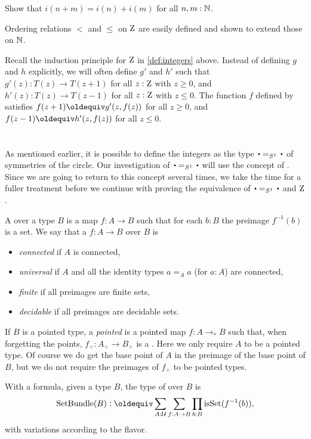 \begin{xca}\label{xca:addition-on-Z-and-N}
Show that $i(n+m)=i(n)+i(m)$ for all $n,m:\mathbb{N}$.
\end{xca}

Ordering relations $<$ and $\leq$ on $\mathrm{Z}$ are easily defined
and shown to extend those on $\mathbb{N}$.

Recall the induction principle for $\mathrm{Z}$ in \cref{def:integers} above.
Instead of defining $g$ and $h$ explicitly, we will often
define $g'$ and $h'$ such that $g'(z): T(z)\to T(z+1)$ 
for all $z:\mathrm{Z}$ with $z\geq 0$, and $h'(z): T(z)\to T(z-1)$ 
for all $z:\mathrm{Z}$ with $z\leq 0$. The function $f$ defined by 
satisfies $f(z+1)\jdeq g'(z,f(z))$ for all $z\geq 0$,
and $f(z-1)\jdeq h'(z,f(z))$ for all $z\leq 0$.


\section{\Coverings}
\label{sec:covering}

As mentioned earlier, it is possible to define the integers as the
type $\base=_{S^1}\base$ of symmetries of the circle.
Our investigation of $\base=_{S^1}\base$ will use the concept of \coverings. 
Since we are going to return to this concept several times, 
we take the time for a fuller treatment before we continue with
proving the equivalence of $\base=_{S^1}\base$ and $\mathrm{Z}$.

\begin{definition}\label{def:covering}
A \emph{\covering} over a type $B$ 
is a map $f:A\to B$ such that for each $b:B$ the preimage $f^{-1}(b)$ is a set.
We say that a \covering $f:A\to B$ over $B$ is
\begin{itemize}
\item \emph{connected} if $A$ is connected, 
\item \emph{universal} if $A$ and all 
the identity types $a=_Aa$ (for $a:A$) are connected, 
\item \emph{finite} if all preimages are finite sets,
\item \emph{decidable} if all preimages are decidable sets.
\end{itemize}
If $B$ is a pointed type, a \emph{pointed} \covering is a pointed map $f:A\to_*B$ such that, when forgetting the points, $f_\div:A_\div\to B_\div$ is a \covering. Here we only
require $A$ to be a pointed type. Of course we do get the base point of $A$ in the 
preimage of the base point of $B$, but we do not require the preimages of $f_\div$
to be pointed types.
\end{definition}
With a formula, given a type $B$, the type of \coverings over $B$ is
\[
\SetBundle(B) \defeq \sum_{A:\UU}\sum_{f:A\to B}\prod_{b:B}\isset(f^{-1}(b)),
\]
with variations according to the flavor.

